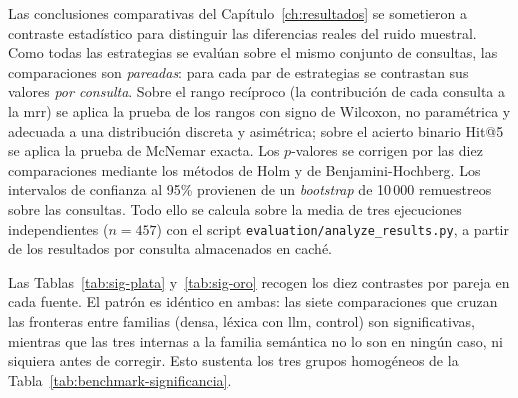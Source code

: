 Las conclusiones comparativas del Capítulo~\ref{ch:resultados} se sometieron a contraste estadístico para distinguir las diferencias reales del ruido muestral.
Como todas las estrategias se evalúan sobre el mismo conjunto de consultas, las comparaciones son \emph{pareadas}: para cada par de estrategias se contrastan sus valores \emph{por consulta}.
Sobre el rango recíproco (la contribución de cada consulta a la \gls{mrr}) se aplica la prueba de los rangos con signo de Wilcoxon, no paramétrica y adecuada a una distribución discreta y asimétrica; sobre el acierto binario \mbox{Hit@5} se aplica la prueba de McNemar exacta.
Los $p$-valores se corrigen por las diez comparaciones mediante los métodos de Holm y de Benjamini-Hochberg.
Los intervalos de confianza al 95\% provienen de un \emph{bootstrap} de 10\,000 remuestreos sobre las consultas.
Todo ello se calcula sobre la media de tres ejecuciones independientes ($n=457$) con el script \texttt{evaluation/analyze\_\-results.py}, a partir de los resultados por consulta almacenados en caché.

Las Tablas~\ref{tab:sig-plata} y~\ref{tab:sig-oro} recogen los diez contrastes por pareja en cada fuente.
El patrón es idéntico en ambas: las siete comparaciones que cruzan las fronteras entre familias (densa, léxica con \gls{llm}, control) son significativas, mientras que las tres internas a la familia semántica no lo son en ningún caso, ni siquiera antes de corregir.
Esto sustenta los tres grupos homogéneos de la Tabla~\ref{tab:benchmark-significancia}.


